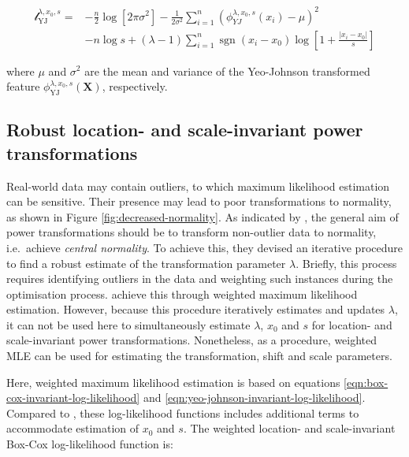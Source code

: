 \documentclass[preprint,12pt,authoryear]{elsarticle}
\DeclareMathOperator{\sgn}{sgn}
\begin{document}
\begin{equation}
\label{eqn:yeo-johnson-invariant-log-likelihood}
\begin{split}
\mathcal{l}_{\text{YJ}}^{\lambda, x_0, s} = & -\frac{n}{2} \log\left[2 \pi \sigma^2\right] -\frac{1}{2 \sigma^2} \sum_{i=1}^n \left( \phi_{YJ}^{\lambda, x_0, s}(x_i) - \mu \right)^2 \\
& - n \log s + (\lambda - 1) \sum_{i=1}^n \sgn(x_i - x_0) \log \left[1 + \frac{|x_i - x_0|}{s} \right]
\end{split}
\end{equation}

where \(\mu\) and \(\sigma^2\) are the mean and variance of the
Yeo-Johnson transformed feature
\(\phi_{\text{YJ}}^{\lambda, x_0, s} (\mathbf{X})\), respectively.

\subsection{Robust location- and scale-invariant power
transformations}\label{robust-location--and-scale-invariant-power-transformations}

Real-world data may contain outliers, to which maximum likelihood
estimation can be sensitive. Their presence may lead to poor
transformations to normality, as shown in Figure
\ref{fig:decreased-normality}. As indicated by \citet{Raymaekers2024-zf},
the general aim of power transformations should be to transform
non-outlier data to normality, i.e.~achieve \emph{central normality}. To
achieve this, they devised an iterative procedure to find a robust
estimate of the transformation parameter \(\lambda\). Briefly, this
process requires identifying outliers in the data and weighting such
instances during the optimisation process. \citet{Raymaekers2024-zf}
achieve this through weighted maximum likelihood estimation.
However, because this procedure iteratively estimates and updates
\(\lambda\), it can not be used here to simultaneously estimate
\(\lambda\), \(x_0\) and \(s\) for location- and scale-invariant power
transformations. Nonetheless, as a procedure, weighted MLE can be used
for estimating the transformation, shift and scale parameters.

Here, weighted maximum likelihood estimation is based on equations
\ref{eqn:box-cox-invariant-log-likelihood} and
\ref{eqn:yeo-johnson-invariant-log-likelihood}. Compared to \citet{Raymaekers2024-zf},
these log-likelihood functions includes additional
terms to accommodate estimation of \(x_0\) and \(s\). The weighted
location- and scale-invariant Box-Cox log-likelihood function is:
\end{document}
